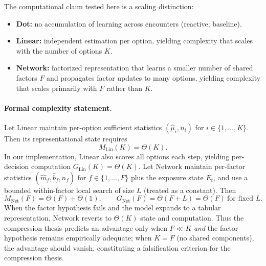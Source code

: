 \documentclass[11pt]{article}
\begin{document}
The computational claim tested here is a scaling distinction:
\begin{itemize}[leftmargin=*]
\item \textbf{Dot:} no accumulation of learning across encounters (reactive; baseline).
\item \textbf{Linear:} independent estimation per option, yielding complexity that scales with the number of options $K$.
\item \textbf{Network:} factorized representation that learns a smaller number of shared factors $F$ and propagates factor updates to many options, yielding complexity that scales primarily with $F$ rather than $K$.
\end{itemize}


\paragraph{Formal complexity statement.}
Let Linear maintain per-option sufficient statistics $(\widehat{\mu}_i,n_i)$ for $i\in\{1,\dots,K\}$.
Then its representational state requires
\[
M_{\mathrm{Lin}}(K)=\Theta(K).
\]
In our implementation, Linear also scores all options each step, yielding per-decision computation
$G_{\mathrm{Lin}}(K)=\Theta(K)$.
Let Network maintain per-factor statistics $(\widehat{m}_f,\widehat{b}_f,n_f)$ for $f\in\{1,\dots,F\}$ plus the exposure state $E_t$, and use a bounded within-factor local search of size $L$ (treated as a constant).
Then
\[
M_{\mathrm{Net}}(F)=\Theta(F)+\Theta(1),\qquad
G_{\mathrm{Net}}(F)=\Theta(F+L)=\Theta(F)\ \text{for fixed }L.
\]
When the factor hypothesis fails and the model expands to a tabular representation, Network reverts to $\Theta(K)$ state and computation.
Thus the compression thesis predicts an advantage only when $F\ll K$ \emph{and} the factor hypothesis remains empirically adequate; when $K=F$ (no shared components), the advantage should vanish, constituting a falsification criterion for the compression thesis.
\end{document}
